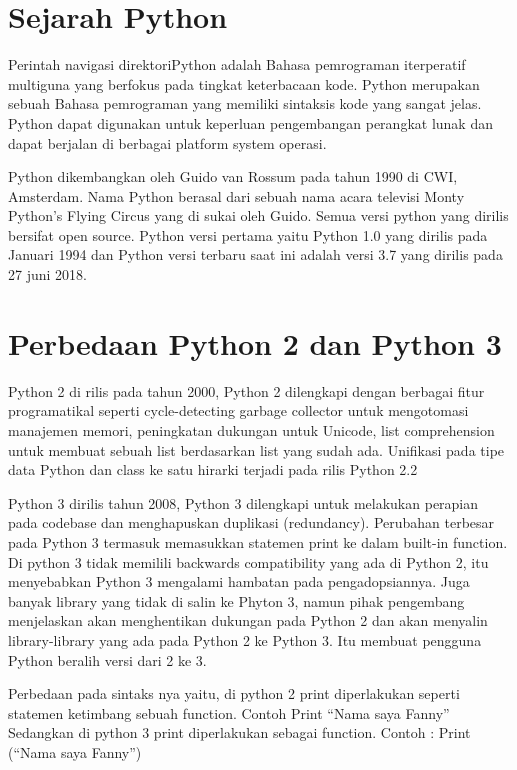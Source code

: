 \documentclass[lipt]{Article}
\begin{document}

\section{Sejarah Python}

Perintah navigasi direktoriPython adalah Bahasa pemrograman iterperatif multiguna yang berfokus pada tingkat keterbacaan kode. Python merupakan sebuah Bahasa pemrograman yang memiliki  sintaksis kode yang sangat jelas. Python dapat digunakan untuk keperluan pengembangan perangkat lunak dan dapat berjalan di berbagai platform system operasi.

Python dikembangkan oleh Guido van Rossum pada tahun 1990 di CWI, Amsterdam. Nama Python berasal dari sebuah nama acara televisi Monty Python's Flying Circus yang di sukai oleh Guido. 
Semua versi python yang dirilis bersifat open source. Python versi pertama yaitu Python 1.0 yang dirilis pada Januari  1994 dan Python versi terbaru saat ini adalah versi 3.7 yang dirilis pada 27 juni 2018.

\section{Perbedaan Python 2 dan Python 3}

Python 2 di rilis pada tahun 2000, Python 2 dilengkapi dengan berbagai fitur programatikal seperti cycle-detecting garbage collector untuk mengotomasi manajemen memori, peningkatan dukungan untuk Unicode, list comprehension untuk membuat sebuah list berdasarkan list yang sudah ada. Unifikasi pada tipe data Python dan class ke satu hirarki terjadi pada rilis Python 2.2

Python 3 dirilis tahun 2008, Python 3 dilengkapi untuk melakukan perapian pada codebase dan menghapuskan duplikasi (redundancy). Perubahan terbesar pada Python 3 termasuk memasukkan statemen print ke dalam built-in function. Di python 3 tidak memilili backwards compatibility yang ada di Python 2, itu menyebabkan Python 3 mengalami hambatan pada pengadopsiannya. Juga banyak library yang tidak di salin ke Phyton 3, namun pihak pengembang menjelaskan akan menghentikan  dukungan pada Python 2 dan akan menyalin library-library yang ada pada Python 2 ke Python 3. Itu membuat pengguna Python beralih versi dari 2 ke 3.

Perbedaan pada sintaks nya yaitu, di python 2 print diperlakukan seperti statemen ketimbang sebuah function. Contoh
Print “Nama saya Fanny”
Sedangkan di python 3 print diperlakukan sebagai function. Contoh :
Print (“Nama saya Fanny”)
\end{document}
